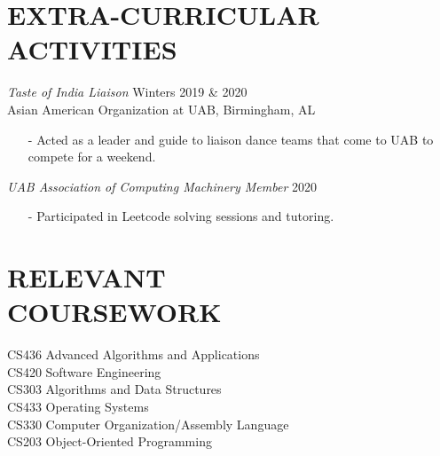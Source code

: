 \documentclass[margin, 10pt]{res} %
\begin{document}
\begin{resume}
\section{EXTRA-CURRICULAR \\ ACTIVITIES} 

{\sl Taste of India Liaison} \hfill Winters 2019 \& 2020 \\
Asian American Organization at UAB, Birmingham, AL
\begin{itemize}
\item[-] Acted as a leader and guide to liaison dance teams that come to UAB to compete for a weekend.
\end{itemize}

{\sl UAB Association of Computing Machinery Member} \hfill 2020 \
\begin{itemize}
\item[-] Participated in Leetcode solving sessions and tutoring.
\end{itemize}

\section{RELEVANT \\ COURSEWORK}

CS436 Advanced Algorithms and Applications \\
CS420 Software Engineering \\
CS303 Algorithms and Data Structures \\
CS433 Operating Systems \\
CS330 Computer Organization/Assembly Language \\
CS203 Object-Oriented Programming



\end{resume}
\end{document}
